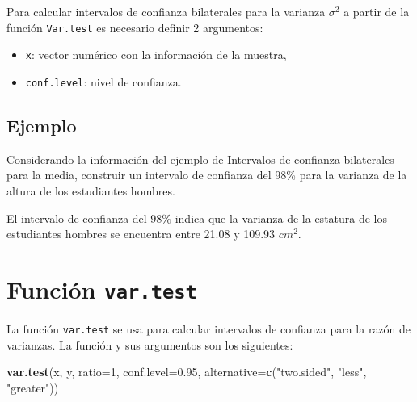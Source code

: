 \documentclass[10pt,]{krantz}
\makeatletter
\newenvironment{Shaded}{\begin{snugshade}}{\end{snugshade}}
\newcommand{\KeywordTok}[1]{\textcolor[rgb]{0.13,0.29,0.53}{\textbf{{#1}}}}
\newcommand{\DataTypeTok}[1]{\textcolor[rgb]{0.13,0.29,0.53}{{#1}}}
\newcommand{\DecValTok}[1]{\textcolor[rgb]{0.00,0.00,0.81}{{#1}}}
\newcommand{\FloatTok}[1]{\textcolor[rgb]{0.00,0.00,0.81}{{#1}}}
\newcommand{\StringTok}[1]{\textcolor[rgb]{0.31,0.60,0.02}{{#1}}}
\newcommand{\CommentTok}[1]{\textcolor[rgb]{0.56,0.35,0.01}{\textit{{#1}}}}
\newcommand{\NormalTok}[1]{{#1}}
\providecommand{\tightlist}{%
  \setlength{\itemsep}{0pt}\setlength{\parskip}{0pt}}
\newenvironment{kframe}{%
\medskip{}
\setlength{\fboxsep}{.8em}
 \def\at@end@of@kframe{}%
 \ifinner\ifhmode%
  \def\at@end@of@kframe{\end{minipage}}%
  \begin{minipage}{\columnwidth}%
 \fi\fi%
 \def\FrameCommand##1{\hskip\@totalleftmargin \hskip-\fboxsep
 \colorbox{shadecolor}{##1}\hskip-\fboxsep
     \hskip-\linewidth \hskip-\@totalleftmargin \hskip\columnwidth}%
 \MakeFramed {\advance\hsize-\width
   \@totalleftmargin\z@ \linewidth\hsize
   \@setminipage}}%
 {\par\unskip\endMakeFramed%
 \at@end@of@kframe}
\renewenvironment{Shaded}{\begin{kframe}}{\end{kframe}}
\makeatother
\begin{document}
Para calcular intervalos de confianza bilaterales para la varianza
\(\sigma^2\) a partir de la función \texttt{Var.test} es necesario
definir 2 argumentos:

\begin{itemize}
\tightlist
\item
  \texttt{x}: vector numérico con la información de la muestra,
\item
  \texttt{conf.level}: nivel de confianza.
\end{itemize}

\subsection*{Ejemplo}\label{ejemplo-57}


Considerando la información del ejemplo de Intervalos de confianza
bilaterales para la media, construir un intervalo de confianza del 98\%
para la varianza de la altura de los estudiantes hombres.

\begin{Shaded}
\end{Shaded}

El intervalo de confianza del \(98\%\) indica que la varianza de la
estatura de los estudiantes hombres se encuentra entre 21.08 y 109.93
\(cm^{2}\).

\section{\texorpdfstring{Función
\texttt{var.test}}{Función var.test}}\label{funcion-var.test-1}

La función \texttt{var.test} se usa para calcular intervalos de
confianza para la razón de varianzas. La función y sus argumentos son
los siguientes:

\begin{Shaded}
\begin{Highlighting}[]
\KeywordTok{var.test}\NormalTok{(x, y, }\DataTypeTok{ratio=}\DecValTok{1}\NormalTok{, }\DataTypeTok{conf.level=}\FloatTok{0.95}\NormalTok{, }
         \DataTypeTok{alternative=}\KeywordTok{c}\NormalTok{(}\StringTok{"two.sided"}\NormalTok{, }\StringTok{"less"}\NormalTok{, }\StringTok{"greater"}\NormalTok{))}
\end{Highlighting}
\end{Shaded}
\end{document}
